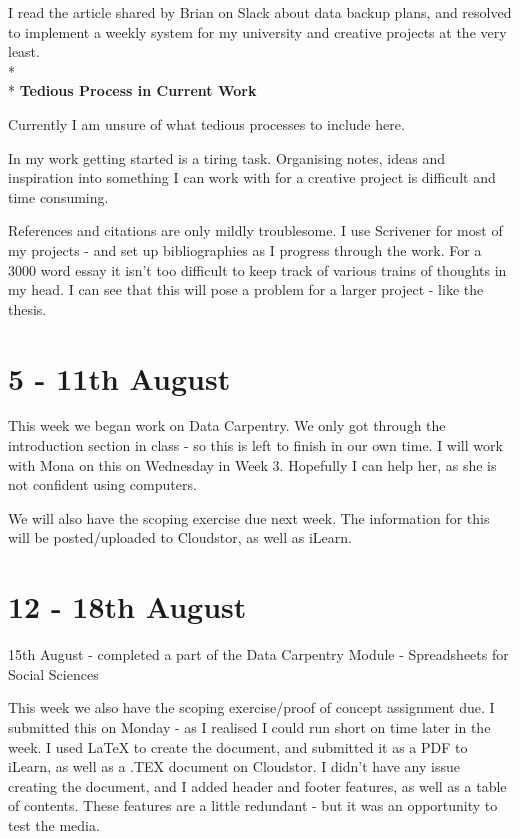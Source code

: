 \documentclass{article}
\begin{document}
I read the article shared by Brian on Slack about data backup plans, and resolved to implement a weekly system for my university and creative projects at the very least. 
\\*
\\*
\noindent \textbf{Tedious Process in Current Work}

Currently I am unsure of what tedious processes to include here.

In my work getting started is a tiring task. Organising notes, ideas and inspiration into something I can work with for a creative project is difficult and time consuming.

References and citations are only mildly troublesome. I use Scrivener for most of my projects - and set up bibliographies as I progress through the work. For a 3000 word essay it isn't too difficult to keep track of various trains of thoughts in my head. I can see that this will pose a problem for a larger project - like the thesis.

\section{5 - 11th August}

This week we began work on Data Carpentry. We only got through the introduction section in class - so this is left to finish in our own time. I will work with Mona on this on Wednesday in Week 3. Hopefully I can help her, as she is not confident using computers. 

We will also have the scoping exercise due next week. The information for this will be posted/uploaded to Cloudstor, as well as iLearn.

\section{12 - 18th August}

15th August - completed a part of the Data Carpentry Module - Spreadsheets for Social Sciences

This week we also have the scoping exercise/proof of concept assignment due. I submitted this on Monday - as I realised I could run short on time later in the week. 
I used LaTeX to create the document, and submitted it as a PDF to iLearn, as well as a .TEX document on Cloudstor. 
I didn't have any issue creating the document, and I added header and footer features, as well as a table of contents. These features are a little redundant - but it was an opportunity  to test the media. 
\end{document}
